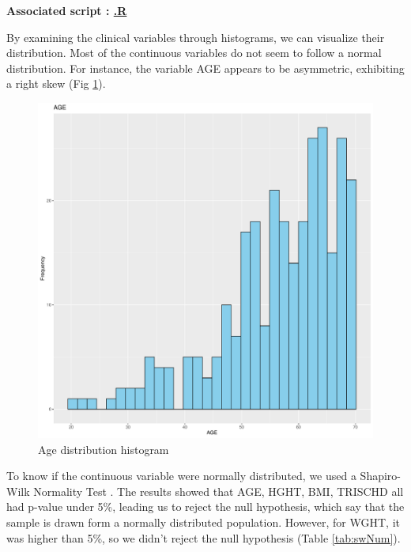 \documentclass[a4paper, 11pt]{article}
\begin{document}
\begin{multicols}{2}
\begin{scriptsize}	
	
	\textbf{Associated script : \href{https://github.com/leopoldguyot/BINF-F401-Project/*}{.R}}
\end{scriptsize}

By examining the clinical variables through histograms, we can visualize their distribution. 
Most of the continuous variables do not seem to follow a normal distribution. 
For instance, the variable AGE appears to be asymmetric, exhibiting a right skew (Fig \ref{fig:ageDistrib}).

\begin{figure}[H]
	\centering
	\includegraphics[width=\columnwidth]{figures/clinical_data_var_dist/AGE}
	\caption{Age distribution histogram }
	\label{fig:ageDistrib}
\end{figure}

To know if the continuous variable were normally distributed, we used a Shapiro-Wilk Normality Test \citep{R:2024}. 
The results showed that AGE, HGHT, BMI, TRISCHD all had p-value under 5\%, leading us to reject the null hypothesis, which say that the sample is drawn form a normally distributed population. 
However, for WGHT, it was higher than 5\%, so we didn’t reject the null hypothesis (Table \ref{tab:swNum}). 


\end{multicols}
\end{document}
